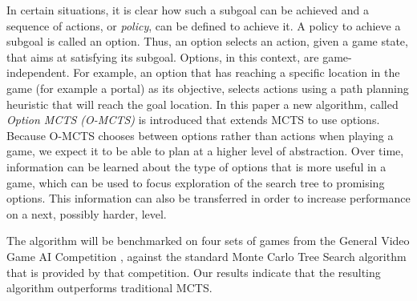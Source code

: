 
In certain situations, it is clear how such a subgoal can be achieved and a
sequence of actions, or \emph{policy}, can be defined to achieve it. A policy to
achieve a subgoal is called an option. Thus, an option selects an action, given
a game state, that aims at satisfying its subgoal.  Options, in this context, are
game-independent. For example, an option that has reaching a specific location
in the game (for example a portal) as its objective, selects actions using a
path planning heuristic that will reach the goal location. In this paper a new
algorithm, called \emph{Option MCTS (O-MCTS)} is introduced that extends MCTS to
use options. Because O-MCTS chooses between options rather than actions when
playing a game, we expect it to be able to plan at a higher level of
abstraction. Over time, information can be learned about the type of options
that is more useful in a game, which can be used to focus exploration of the
search tree to promising options. This information can also be transferred in
order to increase performance on a next, possibly harder, level. 

The algorithm will be benchmarked on four sets of games from the General Video
Game AI Competition \cite{perez2014}, against the standard Monte Carlo Tree
Search algorithm that is provided by that competition.  Our results indicate
that the resulting algorithm outperforms traditional MCTS.

